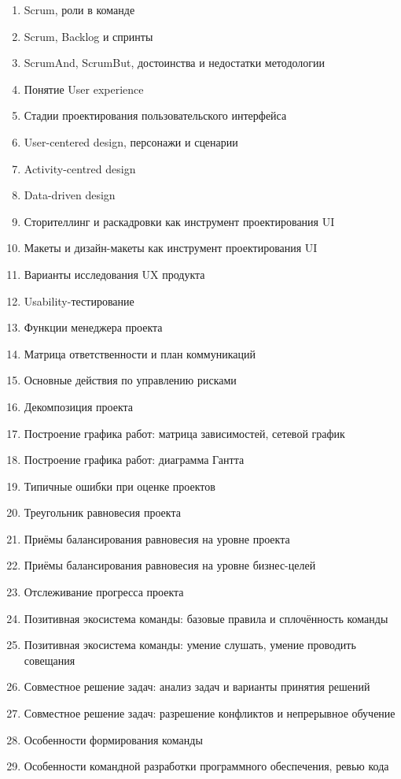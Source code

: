 \documentclass[a5paper]{article}
\begin{document}
\begin{enumerate}
    \item Scrum, роли в команде
    \item Scrum, Backlog и спринты
    \item ScrumAnd, ScrumBut, достоинства и недостатки методологии
    \item Понятие User experience
    \item Стадии проектирования пользовательского интерфейса
    \item User-centered design, персонажи и сценарии
    \item Activity-centred design
    \item Data-driven design
    \item Сторителлинг и раскадровки как инструмент проектирования UI
    \item Макеты и дизайн-макеты как инструмент проектирования UI
    \item Варианты исследования UX продукта
    \item Usability-тестирование
    \item Функции менеджера проекта
    \item Матрица ответственности и план коммуникаций
    \item Основные действия по управлению рисками
    \item Декомпозиция проекта
    \item Построение графика работ: матрица зависимостей, сетевой график
    \item Построение графика работ: диаграмма Гантта
    \item Типичные ошибки при оценке проектов
    \item Треугольник равновесия проекта
    \item Приёмы балансирования равновесия на уровне проекта
    \item Приёмы балансирования равновесия на уровне бизнес-целей
    \item Отслеживание прогресса проекта
    \item Позитивная экосистема команды: базовые правила и сплочённость команды
    \item Позитивная экосистема команды: умение слушать, умение проводить совещания
    \item Совместное решение задач: анализ задач и варианты принятия решений
    \item Совместное решение задач: разрешение конфликтов и непрерывное обучение
    \item Особенности формирования команды
    \item Особенности командной разработки программного обеспечения, ревью кода

\end{enumerate}
\end{document}
